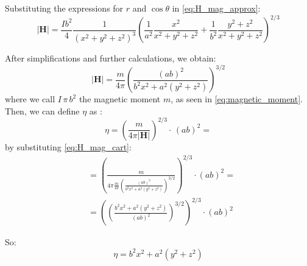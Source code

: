 Substituting the expressions for \(r\) and \(\cos\theta\) in \ref{eq:H_mag_approx}:
\[
\left| \mathbf{H} \right| = \frac{I b^2}{4} \frac{1}{(x^2 + y^2 + z^2)^{3}} \left(\frac{1}{a^2} \frac{x^2}{x^2 + y^2 + z^2} + \frac{1}{b^2} \frac{y^2 + z^2}{x^2 + y^2 + z^2}\right)^{2/3}
\]

After simplifications and further calculations, we obtain:
\begin{equation}
    \left| \mathbf{H} \right| = \frac{m}{4 \pi} \left(\frac{(ab)^2}{b^2 x^2 + a^2 (y^2 + z^2)}\right)^{3/2}
    \label{eq:H_mag_cart}
\end{equation}
where we call $I \, \pi \, b^2$ the magnetic moment $m$, as seen in \ref{eq:magnetic_moment}.
Then, we can define $\eta$ as \cite{main}:
\[ \eta = \left( \frac{m}{4 \pi \left| \mathbf{H} \right|} \right)^{2/3} \cdot \, (ab)^2 = \]
by substituting \ref{eq:H_mag_cart}:
\[
\begin{aligned}
&= \left( \frac{m}{4 \pi \frac{m}{4 \pi} \left(\frac{(ab)^2}{b^2 x^2 + a^2 (y^2 + z^2)}\right)^{3/2}} \right)^{2/3} \cdot (ab)^2 = 
\\
&= \left( \left(\frac{b^2 x^2 + a^2 (y^2 + z^2)}{(ab)^2}\right)^{3/2}\right)^{2/3} \cdot (ab)^2
\end{aligned}
\]

So:
\begin{equation}
    \eta = b^2 x^2 + a^2 (y^2 + z^2)
    \label{eq:eta}
\end{equation}

